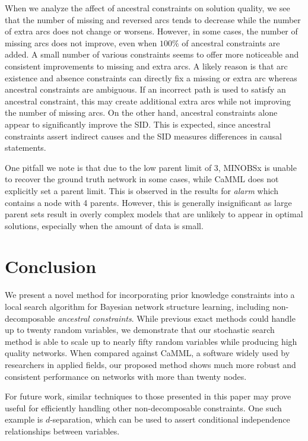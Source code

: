 \documentclass[twoside,11pt]{article}
\begin{document}
\smallskip
When we analyze the affect of ancestral constraints on solution quality, we see that the number of missing and reversed arcs tends to decrease while the number of extra arcs
does not change or worsens. However, in some cases, the number of missing arcs does not improve, even when $100\%$ of ancestral constraints are added.
A small number of various constraints seems to offer more noticeable and consistent improvements to missing and extra arcs. 
 A likely reason is that arc existence and absence constraints can directly fix a missing or extra arc whereas ancestral constraints are 
ambiguous. If an incorrect path is used to satisfy an ancestral constraint, this may create additional extra arcs while not improving the number of missing arcs. 
On the other hand, ancestral constraints alone appear to significantly improve the SID. This is expected, since ancestral constraints assert
indirect causes and the SID measures differences in causal statements.

\smallskip
One pitfall we note is that due to the low parent limit of 3, MINOBSx is unable to recover the ground truth network in some cases, while CaMML does not explicitly set a parent limit. 
This is observed in the results for \emph{alarm} which contains a node with 4 parents. However, this is generally insignificant as large parent sets result in overly complex models that are unlikely to appear in optimal
solutions, especially when the amount of data is small. 


\section{Conclusion}

We present a novel method for incorporating prior knowledge constraints into a local search algorithm for Bayesian network structure learning, including non-decomposable \emph{ancestral constraints}. While previous exact methods could handle up to twenty random variables, we demonstrate that our stochastic search method
is able to scale up to nearly fifty random variables while producing high quality networks. When compared against CaMML, a software widely used by researchers in applied
fields, our proposed method shows much more robust and consistent performance on networks with more than twenty nodes. 

\smallskip
For future work,
similar techniques to those presented in this paper may prove useful for efficiently handling other non-decomposable constraints. One such example 
is $d$-separation, which can be used to assert conditional independence relationships between variables.
\end{document}
